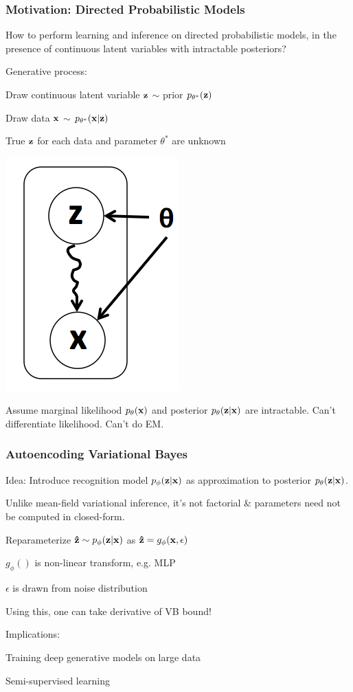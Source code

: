 \begin{frame}
\frametitle{Motivation: Directed Probabilistic Models}
\bi
\item How to perform learning and inference on directed probabilistic models, in the presence of continuous latent variables with intractable posteriors? \pause
\item Generative process:
	\be
	\item Draw continuous latent variable $\bf{z}$ $\sim$ prior $p_{\theta^*}(\bf{z})$ 
	\item Draw data $\bf{x}$ $\sim$ $p_{\theta^*}(\bf{x}|\bf{z})$ 
	\ee 
	\bi
	\item True $\bf{z}$ for each data and parameter $\theta^*$ are unknown
	\ei
	\centerline{\includegraphics[scale=0.2]{figs/autoencoding_variationalbayes1}}
	\pause
\item Assume marginal likelihood $p_{\theta}(\bf{x})$ and posterior $p_{\theta}(\bf{z}|\bf{x})$ are intractable. Can't differentiate likelihood. Can't do EM.
\ei

\end{frame}

\begin{frame}
\frametitle{Autoencoding Variational Bayes \cite{kingma14variational}}
\bi
\item Idea: Introduce {\color{red} recognition model} $p_{\phi}(\bf{z}|\bf{x})$ as approximation to posterior $p_{\theta}(\bf{z}|\bf{x})$. 
\item Unlike mean-field variational inference, it's not factorial \& parameters need not be computed in closed-form.\pause
\item Reparameterize ${\bf{\hat{z}}} \sim p_{\phi}(\bf{z}|\bf{x})$ as ${\bf{\hat{z}}} = g_{\phi}(\bf{x}, \epsilon)$
	\bi
	\item $g_\phi()$ is non-linear transform, e.g. MLP
	\item $\epsilon$ is drawn from noise distribution
	\item Using this, one can take derivative of VB bound!\pause
	\ei
\item Implications:
\bi
	\item Training deep generative models on large data
	\item Semi-supervised learning \cite{kingma14ssl}
\ei
\ei
\end{frame}


